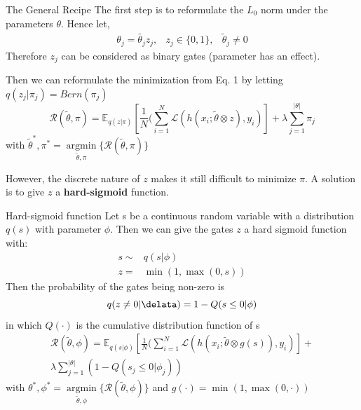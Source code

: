 \documentclass{beamer}
\DeclareMathOperator*{\argmin}{argmin}
\begin{document}
\begin{frame}[t]{The General Recipe}
  The first step is to reformulate the $L_0$ norm under the parameters $\theta$.
  Hence let,
  \begin{equation}
    \begin{matrix}
      \theta_j = \tilde{\theta_j}z_j, & z_j \in \{0, 1\}, & \tilde{\theta}_j \neq 0
    \end{matrix}
  \end{equation}
  Therefore $z_j$ can be considered as binary gates (parameter has an effect).

  Then we can reformulate the minimization from Eq. 1 by letting $q(z_j|\pi_j) = Bern(\pi_j)$
  \begin{equation}
    \mathcal{R}(\tilde{\theta}, \pi) = \mathbb{E}_{q(z|\pi)} [\frac{1}{N} ( \sum^N_{i=1} \mathcal{L}(h(x_i; \tilde{\theta} \otimes z), y_i)] + \lambda \sum^{|\theta|}_{j=1} \pi_j
  \end{equation}
  with  $\tilde{\theta}^*, \pi^* = \underset{{\tilde{\theta}, \pi}}{\argmin} \{\mathcal{R}(\tilde{\theta}, \pi)\}$

  However, the discrete nature of $z$ makes it still difficult to minimize $\pi$.
  A solution is to give $z$ a \textbf{hard-sigmoid} function.
\end{frame}

\begin{frame}[t]{Hard-sigmoid function}
  \small
  Let s be a continuous random variable with a distribution $q(s)$ with parameter $\phi$.
  Then we can give the gates $z$ a hard sigmoid function with:
  \begin{equation}
    \begin{align*}
      s \sim& q(s|\phi) \\
      z =& \min(1, \max(0, s))
    \end{align*}
  \end{equation}
  Then the probability of the gates being non-zero is
  \begin{equation}
    q(z \neq 0 | \delata) =  1 - Q(s\leq 0 | \phi)
  \end{equation}
  in which $Q(\cdot)$ is the cumulative distribution function of s
  \begin{equation}
    \begin{split}
      \mathcal{R}(\tilde{\theta}, \phi) = \mathbb{E}_{q(s|\phi)} [\frac{1}{N} ( \sum^N_{i=1} \mathcal{L}(h(x_i; \tilde{\theta} \otimes g(s)), y_i)] + \\ 
      \lambda \sum^{|\theta|}_{j=1} (1 - Q(s_j \leq 0 | \phi_j))
    \end{split}
  \end{equation}
  with $\theta^*, \phi^* = \underset{{\tilde{\theta}, \phi}}{\argmin} \{\mathcal{R}(\tilde{\theta}, \phi)\}$ and $g(\cdot) = \min(1, \max(0, \cdot))$
\end{frame}
\end{document}
